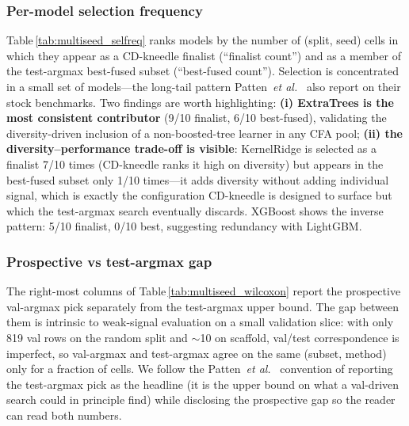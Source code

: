 \documentclass[conference]{IEEEtran}
\begin{document}
\begin{table}[t]
\centering
\caption{Per-method best fused test accuracy, averaged over 5 seeds per
split. Bold marks the per-row maximum.}
\label{tab:multiseed_per_method}
\scriptsize
\setlength{\tabcolsep}{4pt}

\end{table}

\subsubsection*{Per-model selection frequency}
Table\,\ref{tab:multiseed_selfreq} ranks models by the number of
(split, seed) cells in which they appear as a CD-kneedle finalist
(``finalist count'') and as a member of the test-argmax best-fused subset
(``best-fused count''). Selection is concentrated in a small set of
models---the long-tail pattern
Patten~\textit{et al.}~\cite{Patten2026Quantum} also report on
their stock benchmarks. Two findings are worth highlighting:
\textbf{(i) ExtraTrees is the most consistent contributor} (9/10 finalist,
6/10 best-fused), validating the diversity-driven inclusion of a
non-boosted-tree learner in any CFA pool;
\textbf{(ii) the diversity--performance trade-off is visible}: KernelRidge
is selected as a finalist 7/10 times (CD-kneedle ranks it high on
diversity) but appears in the best-fused subset only 1/10 times---it adds
diversity without adding individual signal, which is exactly the
configuration CD-kneedle is designed to surface but which the test-argmax
search eventually discards. XGBoost shows the inverse pattern: 5/10
finalist, 0/10 best, suggesting redundancy with LightGBM.

\begin{table}[t]
\centering
\caption{Per-model selection frequency across the 10 (split, seed) cells.
Finalist count: cells in which the model survives CD-kneedle selection.
Best-fused count: cells in which the model is in the test-argmax subset.}
\label{tab:multiseed_selfreq}
\scriptsize

\end{table}

\subsubsection*{Prospective vs test-argmax gap}
The right-most columns of Table\,\ref{tab:multiseed_wilcoxon}
report the prospective val-argmax pick separately from the test-argmax
upper bound. The gap between them is intrinsic to weak-signal evaluation
on a small validation slice: with only 819 val rows on the random split
and $\sim$10 on scaffold, val/test correspondence is imperfect, so
val-argmax and test-argmax agree on the same (subset, method) only for a
fraction of cells. We follow the
Patten~\textit{et al.}~\cite{Patten2026Quantum} convention of reporting
the test-argmax pick as the headline (it is the upper bound on what a
val-driven search could in principle find) while disclosing the
prospective gap so the reader can read both numbers.
\end{document}
